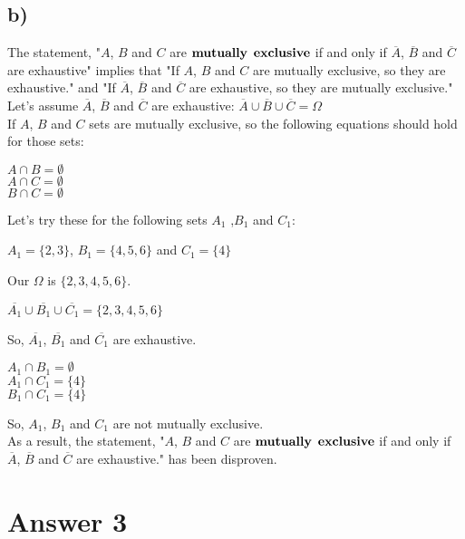 \documentclass[12pt]{article}
\begin{document}
\subsection*{b)}
The statement, "$A$, $B$ and $C$ are $\bold{mutually}$ $\bold{exclusive}$ if and only if $\overline{A}$, $\overline{B}$ and $\overline{C}$ are exhaustive" implies that "If $A$, $B$ and $C$ are mutually exclusive, so they are exhaustive." and "If $\overline{A}$, $\overline{B}$ and $\overline{C}$ are exhaustive, so they are mutually exclusive."\\

Let's assume $\overline{A}$, $\overline{B}$ and $\overline{C}$ are exhaustive: $\overline{A} \cup \overline{B} \cup \overline{C} = \Omega$\\
If $A$, $B$ and $C$ sets are mutually exclusive, so the following equations should hold for those sets:
\begin{center}
    $A \cap B = \emptyset$\\
    $A \cap C = \emptyset$\\
    $B \cap C = \emptyset$\\
\end{center}
Let's try these for the following sets $A_1$ ,$B_1$ and $C_1$:
\begin{center}
    $A_1 = \{ 2, 3\}$, $B_1 = \{4, 5, 6\}$ and $C_1 = \{4\}$
\end{center}
Our $\Omega$ is $\{2, 3, 4, 5, 6\}$.\\
\begin{center}
    $\overline{A_1} \cup \overline{B_1} \cup \overline{C_1} = \{2, 3, 4, 5, 6\}$
\end{center}
So, $\overline{A_1}$, $\overline{B_1}$ and $\overline{C_1}$ are exhaustive.\\
\begin{center}
    $A_1 \cap B_1 = \emptyset$\\
    $A_1 \cap C_1 = \{4\}$\\
    $B_1 \cap C_1 = \{4\}$
\end{center}
So, $A_1$, $B_1$ and $C_1$ are not mutually exclusive.\\
As a result, the statement, "$A$, $B$ and $C$ are $\bold{mutually}$ $\bold{exclusive}$ if and only if $\overline{A}$, $\overline{B}$ and $\overline{C}$ are exhaustive." has been disproven.


\section*{Answer 3}
\end{document}
